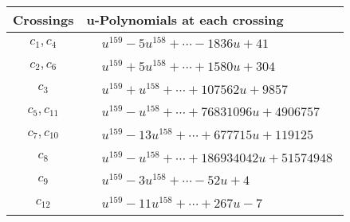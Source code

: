 \documentclass[1p]{elsarticle_modified}
\theoremstyle{definition}
\begin{document}
\begin{tabular}{m{50pt}|m{274pt}}
Crossings & \hspace{64pt}u-Polynomials at each crossing \\
\hline $$\begin{aligned}c_{1},c_{4}\end{aligned}$$&$\begin{aligned}
&u^{159}-5 u^{158}+\cdots-1836 u+41
\end{aligned}$\\
\hline $$\begin{aligned}c_{2},c_{6}\end{aligned}$$&$\begin{aligned}
&u^{159}+5 u^{158}+\cdots+1580 u+304
\end{aligned}$\\
\hline $$\begin{aligned}c_{3}\end{aligned}$$&$\begin{aligned}
&u^{159}+u^{158}+\cdots+107562 u+9857
\end{aligned}$\\
\hline $$\begin{aligned}c_{5},c_{11}\end{aligned}$$&$\begin{aligned}
&u^{159}- u^{158}+\cdots+76831096 u+4906757
\end{aligned}$\\
\hline $$\begin{aligned}c_{7},c_{10}\end{aligned}$$&$\begin{aligned}
&u^{159}-13 u^{158}+\cdots+677715 u+119125
\end{aligned}$\\
\hline $$\begin{aligned}c_{8}\end{aligned}$$&$\begin{aligned}
&u^{159}- u^{158}+\cdots+186934042 u+51574948
\end{aligned}$\\
\hline $$\begin{aligned}c_{9}\end{aligned}$$&$\begin{aligned}
&u^{159}-3 u^{158}+\cdots-52 u+4
\end{aligned}$\\
\hline $$\begin{aligned}c_{12}\end{aligned}$$&$\begin{aligned}
&u^{159}-11 u^{158}+\cdots+267 u-7
\end{aligned}$\\
\hline
\end{tabular}\\~\\
\end{document}
